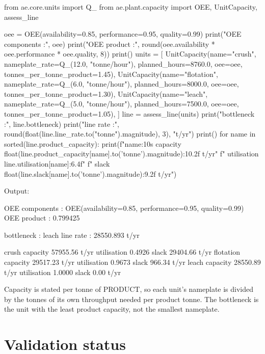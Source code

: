 \documentclass[10pt,a4paper,twoside]{report}
\begin{document}
\begin{doctestblock}
from ae.core.units import Q_
from ae.plant.capacity import OEE, UnitCapacity, assess_line

oee = OEE(availability=0.85, performance=0.95, quality=0.99)
print("OEE components          :", oee)
print("OEE product             :", round(oee.availability * oee.performance * oee.quality, 8))
print()
units = [
    UnitCapacity(name="crush", nameplate_rate=Q_(12.0, "tonne/hour"),
                 planned_hours=8760.0, oee=oee, tonnes_per_tonne_product=1.45),
    UnitCapacity(name="flotation", nameplate_rate=Q_(6.0, "tonne/hour"),
                 planned_hours=8000.0, oee=oee, tonnes_per_tonne_product=1.30),
    UnitCapacity(name="leach", nameplate_rate=Q_(5.0, "tonne/hour"),
                 planned_hours=7500.0, oee=oee, tonnes_per_tonne_product=1.05),
]
line = assess_line(units)
print("bottleneck              :", line.bottleneck)
print("line rate               :", round(float(line.line_rate.to("tonne").magnitude), 3), "t/yr")
print()
for name in sorted(line.product_capacity):
    print(f"{name:10s} capacity {float(line.product_capacity[name].to('tonne').magnitude):10.2f} t/yr"
          f"  utilisation {line.utilisation[name]:6.4f}"
          f"  slack {float(line.slack[name].to('tonne').magnitude):9.2f} t/yr")
\end{doctestblock}

{\footnotesize\color{slate}Output:\par}

\begin{outputblock}
OEE components          : OEE(availability=0.85, performance=0.95, quality=0.99)
OEE product             : 0.799425

bottleneck              : leach
line rate               : 28550.893 t/yr

crush      capacity   57955.56 t/yr  utilisation 0.4926  slack  29404.66 t/yr
flotation  capacity   29517.23 t/yr  utilisation 0.9673  slack    966.34 t/yr
leach      capacity   28550.89 t/yr  utilisation 1.0000  slack      0.00 t/yr
\end{outputblock}

Capacity is stated per tonne of PRODUCT, so each unit's nameplate is divided by the tonnes of its own throughput needed per product tonne. The bottleneck is the unit with the least product capacity, not the smallest nameplate.

\section{Validation status}
\end{document}
